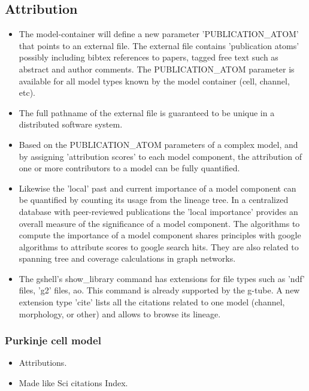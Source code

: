 \documentclass[12pt]{article}
\begin{document}
\subsection{Attribution}
\begin{itemize}
\item The model-container will define a new parameter
  'PUBLICATION\_ATOM' that points to an external file.  The external
  file contains 'publication atoms' possibly including bibtex
  references to papers, tagged free text such as abstract and author
  comments.  The PUBLICATION\_ATOM parameter is available for all
  model types known by the model container (cell, channel, etc).
\item The full pathname of the external file is guaranteed to be
  unique in a distributed software system.
\item Based on the PUBLICATION\_ATOM parameters of a complex model,
  and by assigning 'attribution scores' to each model component, the
  attribution of one or more contributors to a model can be fully
  quantified.
\item Likewise the 'local' past and current importance of a model
  component can be quantified by counting its usage from the lineage
  tree.  In a centralized database with peer-reviewed publications the
  'local importance' provides an overall measure of the significance
  of a model component.  The algorithms to compute the importance of a
  model component shares principles with google algorithms to
  attribute scores to google search hits.  They are also related to
  spanning tree and coverage calculations in graph networks.
\item The gshell's show\_library command has extensions for file types
  such as 'ndf' files, 'g2' files, ao.  This command is already
  supported by the g-tube.  A new extension type 'cite' lists all the
  citations related to one model (channel, morphology, or other) and
  allows to browse its lineage.
\end{itemize}


\subsubsection{Purkinje cell model}
\begin{itemize}
\item Attributions.
\item Made like Sci citations Index.
\end{itemize}
\end{document}

